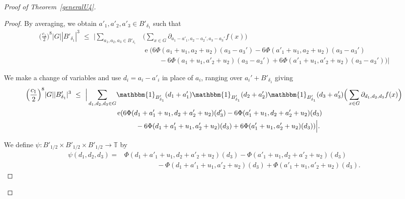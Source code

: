 \documentclass[a4paper,11pt]{article}
\numberwithin{theorem}{section}
\theoremstyle{definition}
\newcommand\id{\mathbbm{1}}
\newcommand{\on}[1]{
	\operatorname{#1}
}
\begin{document}
\begin{proof}[Proof of Theorem~\ref{generalU4}]
\begin{proof}
         By averaging, we obtain $a'_1, a'_2, a'_3 \in B'_{\delta_1}$ such that
         \begin{align*}\Big(\frac{c_1}{2}\Big)^8 |G| |B'_{\delta_1}|^3 \,\,\leq\,\, \Big|\sum_{a_1, a_2, a_3 \in B'_{\delta_1}} &\Big(\sum_{x \in G} \partial_{a_1 - a'_1, a_2 - a_2', a_3 - a_3'} f(x)\Big) \\
         &\on{e}(6\Phi(a_1 + u_1, a_2 + u_2)(a_3 - a_3') - 6\Phi(a'_1 + u_1, a_2 + u_2)(a_3 - a_3')  \\
         &\hspace{1cm}-6\Phi(a_1 + u_1, a'_2 + u_2)(a_3 - a_3') + 6\Phi(a'_1 + u_1, a'_2 + u_2)(a_3 - a_3'))\Big|\end{align*}

         We make a change of variables and use $d_i = a_i - a'_i$ in place of $a_i$, ranging over $a_i' + B'_{\delta_1}$ giving
           \begin{align}\Big(\frac{c_1}{2}\Big)^8 |G| |B'_{\delta_1}|^3 \,\,\leq\,\, \Big|\sum_{d_1, d_2, d_3 \in  G}& \id_{B'_{\delta_1}}(d_1 + a'_1) \id_{B'_{\delta_1}}(d_2 + a'_2)\id_{B'_{\delta_1}}(d_3 + a'_3)\Big(\sum_{x \in G} \partial_{d_1, d_2, d_3} f(x)\Big) \label{u4inversecoprime6eqnbeforepsi}\\
         &\on{e}(6\Phi(d_1 + a'_1 + u_1, d_2 + a'_2 + u_2)(d_3') - 6\Phi(a'_1 + u_1, d_2 + a'_2 + u_2)(d_3) \nonumber\\
         &\hspace{1cm}-6\Phi(d_1 + a'_1 + u_1, a'_2 + u_2)(d_3) + 6\Phi(a'_1 + u_1, a'_2 + u_2)(d_3))\Big|.\nonumber\end{align}

         We define $\psi : B'_{1/2} \times B'_{1/2} \times B'_{1/2} \to \mathbb{T}$ by
         \begin{align*}\psi(d_1, d_2, d_3) = & \Phi(d_1 + a'_1 + u_1, d_2 + a'_2 + u_2)(d_3) - \Phi(a'_1 + u_1, d_2 + a'_2 + u_2)(d_3)  \\
         &\hspace{2cm}-\Phi(d_1 + a'_1 + u_1, a'_2 + u_2)(d_3) + \Phi(a'_1 + u_1, a'_2 + u_2)(d_3).\end{align*}


\end{proof}
\end{proof}
\end{document}
